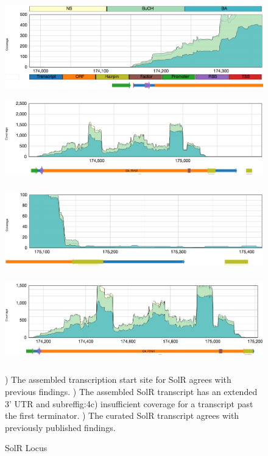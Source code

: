 \begin{figure}

{\includegraphics[width=\textwidth,height=1.5in]{images/Assembly/Examples/Sol/SolR-TSS.png}
\label{fig:4a}}
{\includegraphics[width=\textwidth,height=1.5in]{images/Assembly/Examples/Sol/SolR-transcript.png}
\label{fig:4b}}
{\includegraphics[width=\textwidth,height=1.5in]{images/Assembly/Examples/Sol/SolR-termination.png}
\label{fig:4c}}
{\includegraphics[width=\textwidth,height=1.5in]{images/Assembly/Examples/Sol/SolR-curated.png}
\label{fig:4d}}
\caption{SolR Locus}
) The assembled transcription start site for SolR agrees with previous findings. ) The assembled SolR transcript has an extended 3' UTR and subref{fig:4c}) insufficient coverage for a transcript past the first terminator. ) The curated SolR transcript agrees with previously published findings\cite{69}.
\end{figure}

